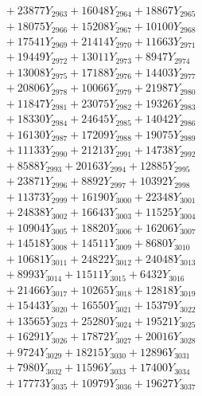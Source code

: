 \documentclass[a4paper,10pt]{article}
\begin{document}
{\begin{align}
&\;  + 23877 Y_{2963} + 16048 Y_{2964} + 18867 Y_{2965} \\[0.3ex]
&\;  + 18075 Y_{2966} + 15208 Y_{2967} + 10100 Y_{2968} \\[0.5ex]\allowbreak
&\;  + 17541 Y_{2969} + 21414 Y_{2970} + 11663 Y_{2971} \\[0.3ex]
&\;  + 19449 Y_{2972} + 13011 Y_{2973} + 8947 Y_{2974} \\[0.3ex]
&\;  + 13008 Y_{2975} + 17188 Y_{2976} + 14403 Y_{2977} \\[0.3ex]
&\;  + 20806 Y_{2978} + 10066 Y_{2979} + 21987 Y_{2980} \\[0.3ex]
&\;  + 11847 Y_{2981} + 23075 Y_{2982} + 19326 Y_{2983} \\[0.3ex]
&\;  + 18330 Y_{2984} + 24645 Y_{2985} + 14042 Y_{2986} \\[0.3ex]
&\;  + 16130 Y_{2987} + 17209 Y_{2988} + 19075 Y_{2989} \\[0.3ex]
&\;  + 11133 Y_{2990} + 21213 Y_{2991} + 14738 Y_{2992} \\[0.3ex]
&\;  + 8588 Y_{2993} + 20163 Y_{2994} + 12885 Y_{2995} \\[0.3ex]
&\;  + 23871 Y_{2996} + 8892 Y_{2997} + 10392 Y_{2998} \\[0.5ex]\allowbreak
&\;  + 11373 Y_{2999} + 16190 Y_{3000} + 22348 Y_{3001} \\[0.3ex]
&\;  + 24838 Y_{3002} + 16643 Y_{3003} + 11525 Y_{3004} \\[0.3ex]
&\;  + 10904 Y_{3005} + 18820 Y_{3006} + 16206 Y_{3007} \\[0.3ex]
&\;  + 14518 Y_{3008} + 14511 Y_{3009} + 8680 Y_{3010} \\[0.3ex]
&\;  + 10681 Y_{3011} + 24822 Y_{3012} + 24048 Y_{3013} \\[0.3ex]
&\;  + 8993 Y_{3014} + 11511 Y_{3015} + 6432 Y_{3016} \\[0.3ex]
&\;  + 21466 Y_{3017} + 10265 Y_{3018} + 12818 Y_{3019} \\[0.3ex]
&\;  + 15443 Y_{3020} + 16550 Y_{3021} + 15379 Y_{3022} \\[0.3ex]
&\;  + 13565 Y_{3023} + 25280 Y_{3024} + 19521 Y_{3025} \\[0.3ex]
&\;  + 16291 Y_{3026} + 17872 Y_{3027} + 20016 Y_{3028} \\[0.5ex]\allowbreak
&\;  + 9724 Y_{3029} + 18215 Y_{3030} + 12896 Y_{3031} \\[0.3ex]
&\;  + 7980 Y_{3032} + 11596 Y_{3033} + 17400 Y_{3034} \\[0.3ex]
&\;  + 17773 Y_{3035} + 10979 Y_{3036} + 19627 Y_{3037} \\[0.3ex]

\end{align}}
\end{document}
